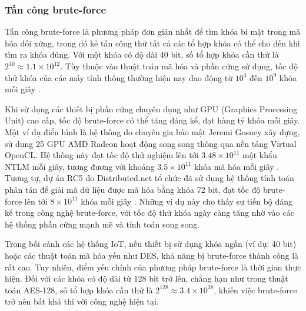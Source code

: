 \subsubsection{Tấn công brute-force}
Tấn công brute-force là phương pháp đơn giản nhất để tìm khóa bí mật trong mã hóa đối xứng, trong đó kẻ tấn công thử tất cả các tổ hợp khóa có thể cho đến khi tìm ra khóa đúng. Với một khóa có độ dài 40 bit, số tổ hợp khóa cần thử là \( 2^{40} \approx 1.1 \times 10^{12} \). Tùy thuộc vào thuật toán mã hóa và phần cứng sử dụng, tốc độ thử khóa của các máy tính thông thường hiện nay dao động từ \( 10^4 \) đến \( 10^9 \) khóa mỗi giây \cite{brute-force1}. 

Khi sử dụng các thiết bị phần cứng chuyên dụng như GPU (Graphics Processing Unit) cao cấp, tốc độ brute-force có thể tăng đáng kể, đạt hàng tỷ khóa mỗi giây. Một ví dụ điển hình là hệ thống do chuyên gia bảo mật Jeremi Gosney xây dựng, sử dụng 25 GPU AMD Radeon hoạt động song song thông qua nền tảng Virtual OpenCL. Hệ thống này đạt tốc độ thử nghiệm lên tới \( 3.48 \times 10^{11} \) mật khẩu NTLM mỗi giây, tương đương với khoảng \( 3.5 \times 10^{11} \) khóa mã hóa mỗi giây \cite{brute-force2}. Tương tự, dự án RC5 do Distributed.net tổ chức đã sử dụng hệ thống tính toán phân tán để giải mã dữ liệu được mã hóa bằng khóa 72 bit, đạt tốc độ brute-force lên tới \( 8 \times 10^{11} \) khóa mỗi giây \cite{brute-force3}. Những ví dụ này cho thấy sự tiến bộ đáng kể trong công nghệ brute-force, với tốc độ thử khóa ngày càng tăng nhờ vào các hệ thống phần cứng mạnh mẽ và tính toán song song.

Trong bối cảnh các hệ thống IoT, nếu thiết bị sử dụng khóa ngắn (ví dụ: 40 bit) hoặc các thuật toán mã hóa yếu như DES, khả năng bị brute-force thành công là rất cao. Tuy nhiên, điểm yếu chính của phương pháp brute-force là thời gian thực hiện. Đối với các khóa có độ dài từ 128 bit trở lên, chẳng hạn như trong thuật toán AES-128, số tổ hợp khóa cần thử là \( 2^{128} \approx 3.4 \times 10^{38} \), khiến việc brute-force trở nên bất khả thi với công nghệ hiện tại.

